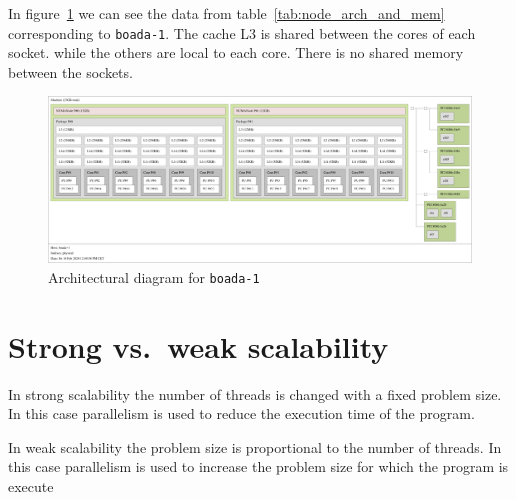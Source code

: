 In figure~\ref{fig:arch_boada1} we can see the data from table~\ref{tab:node_arch_and_mem} corresponding
to \texttt{boada-1}. The cache L3 is shared between the cores of each socket.
 while the others are local to each core. There is no shared memory between the sockets.

\begin{figure}[H]%
    \caption{Architectural diagram for \texttt{boada-1}}%
    \label{fig:arch_boada1}
    \centering
    \includegraphics[width=\textwidth]{./data/map-boada-1.pdf}
\end{figure}


\section{Strong vs.\ weak scalability}%
\label{sec:strong_vs_weak_scalability}


In strong scalability  the  number  of  threads  is  changed  with  a  fixed  problem  size.   In  this  case parallelism is used to reduce the execution time of the program.

In weak scalability the problem size is proportional to the number of threads. In this case parallelism is used to increase the problem size for which the program is execute

